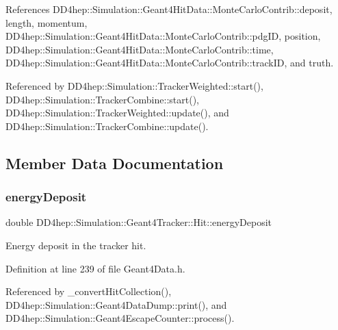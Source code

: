 References D\+D4hep\+::\+Simulation\+::\+Geant4\+Hit\+Data\+::\+Monte\+Carlo\+Contrib\+::deposit, length, momentum, D\+D4hep\+::\+Simulation\+::\+Geant4\+Hit\+Data\+::\+Monte\+Carlo\+Contrib\+::pdg\+ID, position, D\+D4hep\+::\+Simulation\+::\+Geant4\+Hit\+Data\+::\+Monte\+Carlo\+Contrib\+::time, D\+D4hep\+::\+Simulation\+::\+Geant4\+Hit\+Data\+::\+Monte\+Carlo\+Contrib\+::track\+ID, and truth.



Referenced by D\+D4hep\+::\+Simulation\+::\+Tracker\+Weighted\+::start(), D\+D4hep\+::\+Simulation\+::\+Tracker\+Combine\+::start(), D\+D4hep\+::\+Simulation\+::\+Tracker\+Weighted\+::update(), and D\+D4hep\+::\+Simulation\+::\+Tracker\+Combine\+::update().



\subsection{Member Data Documentation}
\hypertarget{class_d_d4hep_1_1_simulation_1_1_geant4_tracker_1_1_hit_a6dddc87da956928e52374040b025f7e4}{}\label{class_d_d4hep_1_1_simulation_1_1_geant4_tracker_1_1_hit_a6dddc87da956928e52374040b025f7e4} 
\subsubsection{\texorpdfstring{energy\+Deposit}{energyDeposit}}
{\footnotesize\ttfamily double D\+D4hep\+::\+Simulation\+::\+Geant4\+Tracker\+::\+Hit\+::energy\+Deposit}



Energy deposit in the tracker hit. 



Definition at line 239 of file Geant4\+Data.\+h.



Referenced by \+\_\+convert\+Hit\+Collection(), D\+D4hep\+::\+Simulation\+::\+Geant4\+Data\+Dump\+::print(), and D\+D4hep\+::\+Simulation\+::\+Geant4\+Escape\+Counter\+::process().

\hypertarget{class_d_d4hep_1_1_simulation_1_1_geant4_tracker_1_1_hit_a39d50debf1a95beaad59be2477877327}{}\label{class_d_d4hep_1_1_simulation_1_1_geant4_tracker_1_1_hit_a39d50debf1a95beaad59be2477877327} 
